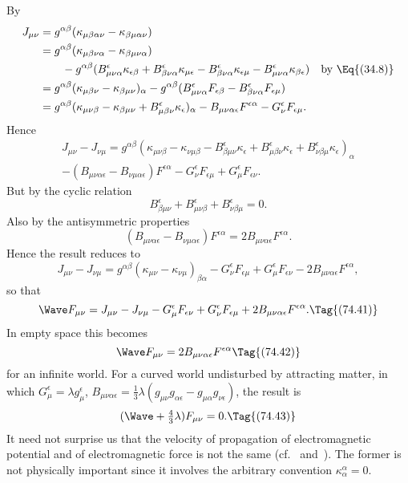\documentclass[12pt]{book}
\begin{document}
By~
\begin{align*}
  J_{\mu\nu}
  &= g^{\alpha\beta}(\kappa_{\mu\beta\alpha\nu} - \kappa_{\beta\mu\alpha\nu}) \\
%
  &= g^{\alpha\beta}(\kappa_{\mu\beta\nu\alpha} - \kappa_{\beta\mu\nu\alpha}) \\
  &\qquad- g^{\alpha\beta} (B_{\mu\nu\alpha}^{\epsilon} \kappa_{\epsilon\beta}
  + B_{\beta\nu\alpha}^{\epsilon} \kappa_{\mu\epsilon}
  - B_{\beta\nu\alpha}^{\epsilon} \kappa_{\epsilon\mu}
  - B_{\mu\nu\alpha}^{\epsilon} \kappa_{\beta\epsilon})
  \quad\text{by~\Eq{(34.8)}} \\
%
  &= g^{\alpha\beta}(\kappa_{\mu\beta\nu} - \kappa_{\beta\mu\nu})_{\alpha}
  - g^{\alpha\beta} (B_{\mu\nu\alpha}^{\epsilon} F_{\epsilon\beta}
  - B_{\beta\nu\alpha}^{\epsilon} F_{\epsilon\mu}) \\
%
    &= g^{\alpha\beta}(\kappa_{\mu\nu\beta} - \kappa_{\beta\mu\nu} + B_{\mu\beta\nu}^{\epsilon} \kappa_{\epsilon})_{\alpha}
  - B_{\mu\nu\alpha\epsilon} F^{\epsilon\alpha} - G_{\nu}^{\epsilon} F_{\epsilon\mu}.
\end{align*}
Hence
\begin{multline*}
  J_{\mu\nu} - J_{\nu\mu} = g^{\alpha\beta}(\kappa_{\mu\nu\beta} - \kappa_{\nu\mu\beta}
  - B_{\beta\mu\nu}^{\epsilon} \kappa_{\epsilon}
  + B_{\mu\beta\nu}^{\epsilon} \kappa_{\epsilon}
  + B_{\nu\beta\mu}^{\epsilon} \kappa_{\epsilon})_{\alpha} \\
  - (B_{\mu\nu\alpha\epsilon} - B_{\nu\mu\alpha\epsilon}) F^{\epsilon\alpha}
  - G_{\nu}^{\epsilon} F_{\epsilon\mu} + G_{\mu}^{\epsilon} F_{\epsilon\nu}.
\end{multline*}
But by the cyclic relation~
\[
B_{\beta\mu\nu}^{\epsilon} + B_{\mu\nu\beta}^{\epsilon} + B_{\nu\beta\mu}^{\epsilon} = 0.
\]
Also by the antisymmetric properties
\[
(B_{\mu\nu\alpha\epsilon} - B_{\nu\mu\alpha\epsilon}) F^{\epsilon\alpha}
= 2B_{\mu\nu\alpha\epsilon} F^{\epsilon\alpha}.
\]
Hence the result reduces to
\[
J_{\mu\nu} - J_{\nu\mu}
= g^{\alpha\beta} (\kappa_{\mu\nu} - \kappa_{\nu\mu})_{\beta\alpha}
- G_{\nu}^{\epsilon} F_{\epsilon\mu}
+ G_{\mu}^{\epsilon} F_{\epsilon\nu}
- 2B_{\mu\nu\alpha\epsilon} F^{\epsilon\alpha},
\]
so that
\[
\Wave F_{\mu\nu} = J_{\mu\nu} - J_{\nu\mu}
- G_{\mu}^{\epsilon} F_{\epsilon\nu}
+ G_{\nu}^{\epsilon} F_{\epsilon\mu}
+ 2B_{\mu\nu\alpha\epsilon} F^{\epsilon\alpha}.
\Tag{(74.41)}
\]
In empty space this becomes
\[
\Wave F_{\mu\nu} = 2B_{\mu\nu\alpha\epsilon} F^{\epsilon\alpha}
\Tag{(74.42)}
\]
for an infinite world. For a curved world undisturbed by attracting matter,
in which $G_{\mu}^{\epsilon} = \lambda g_{\mu}^{\epsilon}$, $B_{\mu\nu\alpha\epsilon} = \frac{1}{3}\lambda(g_{\mu\nu} g_{\alpha\epsilon} - g_{\mu\alpha} g_{\nu\epsilon})$, the result is
\[
(\Wave + \tfrac{4}{3}\lambda)F_{\mu\nu} = 0.
\Tag{(74.43)}
\]
It need not surprise us that the velocity of propagation of electromagnetic
potential and of electromagnetic force is not the same (cf.~ and~).
The former is not physically important since it involves the arbitrary convention
$\kappa_{\alpha}^{\alpha} = 0$.
\end{document}
